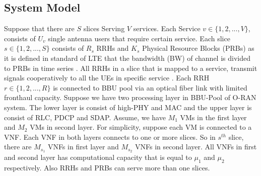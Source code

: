 \documentclass[conference]{IEEEtran}
\begin{document}
\subsection{System Model}
Suppose that there are $S$ slices Serving $V$ services. Each Service $v\in \{1,2,...,V \} $, consists of $U_v$ single antenna users that require certain service. Each slice $s \in \{1,2,...,S \}$ consists of $R_s$ RRHs and $K_s$ Physical Resource Blocks (PRBs) as it is defined in standard of LTE that the bandwidth (BW) of channel is divided to PRBs in time series \cite{lee2018dynamic}. All RRHs in a slice that is mapped to a service, transmit signals cooperatively to all the UEs in specific service \cite{motalleb2017optimal,mimoCran}. Each RRH $r \in \{1,2,...,R \}$ is connected to BBU pool via an optical fiber link with limited fronthaul capacity.
Suppose we have two processing layer in BBU-Pool of O-RAN system. The lower layer is consist of high-PHY and MAC and the upper layer is consist of RLC, PDCP and SDAP.
Assume, we have $M_1$ VMs in the first layer and $M_2$ VMs in second layer.
For simplicity, suppose each VM is connected to a VNF.
Each VNF in both layers connects to one or more slices. So in $s^{th}$ slice, there are $M_{s_1}$ VNFs in first layer and $M_{s_2}$ VNFs in second layer. All VNFs in first and second layer has computational capacity that is  equal to $\mu_1$ and $\mu_2$ respectively. 
Also RRHs and PRBs can serve more than one slices. 
\end{document}
